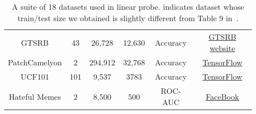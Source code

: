 \documentclass{article} \usepackage{iclr2022_conference,times}
\begin{document}
\begin{table}[t!]
{\begin{tabular}{c | c c c c c }
GTSRB & 43 & 26,728 & 12,630 & Accuracy & \href{https://benchmark.ini.rub.de/gtsrb_dataset.html}{GTSRB website} \\
PatchCamelyon & 2 & 294,912 & 32,768 & Accuracy & \href{https://www.tensorflow.org/datasets/catalog/patch_camelyon}{TensorFlow} \\
UCF101  & 101 & 9,537 & 3783 & Accuracy & \href{https://www.tensorflow.org/datasets/catalog/ucf101}{TensorFlow} \\
Hateful Memes & 2 & 8,500 & 500 & ROC-AUC & \href{https://ai.facebook.com/blog/hateful-memes-challenge-and-data-set/}{FaceBook} \\
\bottomrule
\end{tabular}
}
\vspace{2mm}
\caption{A suite of 18 datasets used in linear probe. indicates dataset whose train/test size we obtained is slightly different from Table 9 in~\citep{radford2021learning}. }
\label{table:lp_dataset}
\end{table}
\end{document}
